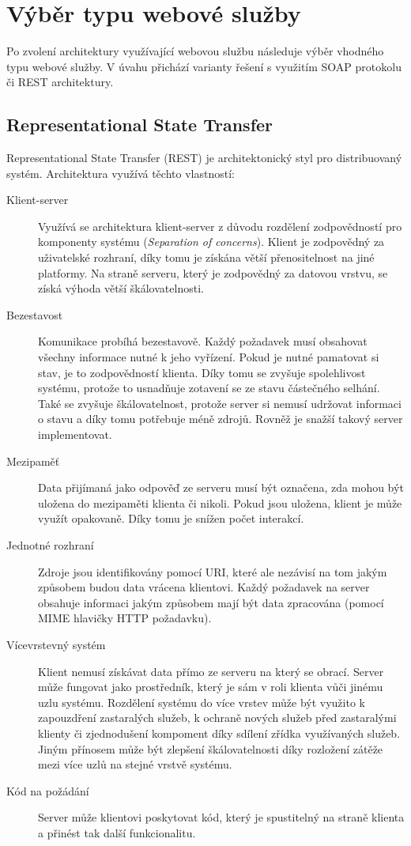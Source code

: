 \documentclass{diplomka}
\begin{document}
\newpage
\section{Výběr typu webové služby}
Po zvolení architektury využívající webovou službu následuje výběr vhodného typu webové služby. V úvahu přichází varianty řešení s využitím SOAP protokolu či REST architektury.
\subsection{Representational State Transfer}
Representational State Transfer\cite{rest} (REST) je architektonický styl pro distribuovaný systém. Architektura využívá těchto vlastností:
\begin{description}
\item [Klient-server] Využívá se architektura klient-server z důvodu rozdělení zodpovědností pro komponenty systému (\emph{Separation of concerns}). Klient je zodpovědný za uživatelské rozhraní, díky tomu je získána větší přenositelnost na jiné platformy. Na straně serveru, který je zodpovědný za datovou vrstvu, se získá výhoda větší škálovatelnosti. 
\item [Bezestavost] Komunikace probíhá bezestavově. Každý požadavek musí obsahovat všechny informace nutné k jeho vyřízení. Pokud je nutné pamatovat si stav, je to zodpovědností klienta. Díky tomu se zvyšuje spolehlivost systému, protože to usnadňuje zotavení se ze stavu částečného selhání. Také se zvyšuje škálovatelnost, protože server si nemusí udržovat informaci o stavu a díky tomu potřebuje méně zdrojů. Rovněž je snažší takový server implementovat.
\item [Mezipaměť] Data přijímaná jako odpověď ze serveru musí být označena, zda mohou být uložena do mezipaměti klienta či nikoli. Pokud jsou uložena, klient je může využít opakovaně. Díky tomu je snížen počet interakcí. 
\item [Jednotné rozhraní] Zdroje jsou identifikovány pomocí URI, které ale nezávisí na tom jakým způsobem budou data vrácena klientovi. Každý požadavek na server obsahuje informaci jakým způsobem mají být data zpracována (pomocí MIME hlavičky HTTP požadavku).  
\item [Vícevrstevný systém] Klient nemusí získávat data přímo ze serveru na který se obrací. Server může fungovat jako prostředník, který je sám v roli klienta vůči jinému uzlu systému. Rozdělení systému do více vrstev může být využito k zapouzdření zastaralých služeb, k ochraně nových služeb před zastaralými klienty či zjednodušení kompoment díky sdílení zřídka využívaných služeb. Jiným přínosem může být zlepšení škálovatelnosti díky rozložení zátěže mezi více uzlů na stejné vrstvě systému.
\item [Kód na požádání] Server může klientovi poskytovat kód, který je spustitelný na straně klienta a přinést tak další funkcionalitu.
\end{description}
\end{document}
